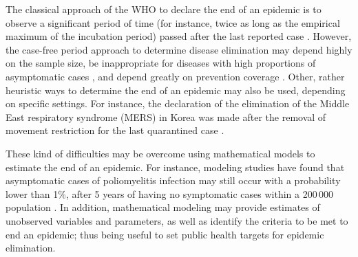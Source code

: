 The classical approach of the WHO to declare the end of an epidemic is to observe a significant period of time (for instance, twice as long as the empirical maximum of the incubation period) passed after the last reported case \cite[]{Nishiura2016}. However, the case-free period approach to determine disease elimination may depend highly on the sample size, be inappropriate for diseases with high proportions of asymptomatic cases \cite[]{Nishiura2016}, and depend greatly on prevention coverage \cite[]{Eichner1996}. Other, rather heuristic ways to determine the end of an epidemic may also be used, depending on specific settings. For instance, the declaration of the elimination of the Middle East respiratory syndrome (MERS) in Korea was made after the removal of movement restriction for the last quarantined case \cite[]{Nishiura2016}.

These kind of difficulties may be overcome using mathematical models to estimate the end of an epidemic. For instance, modeling studies have found that asymptomatic cases of poliomyelitis infection may still occur with a probability lower than 1\%, after 5 years of having no symptomatic cases within a 200\,000 population \cite[]{Eichner1996}. In addition, mathematical modeling may provide estimates of unobserved variables and parameters, as well as identify the criteria to be met to end an epidemic; thus being useful to set public health targets for epidemic elimination.

